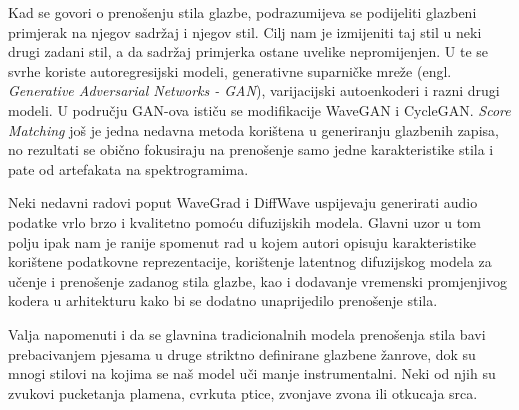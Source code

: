 Kad se govori o prenošenju stila glazbe, podrazumijeva se podijeliti glazbeni primjerak na njegov sadržaj i njegov stil. Cilj nam je izmijeniti taj stil u neki drugi zadani stil, a da sadržaj primjerka ostane uvelike nepromijenjen. U te se svrhe koriste autoregresijski modeli, generativne suparničke mreže (engl. \textit{Generative Adversarial Networks - GAN})\cite{goodfellow2020generative}, varijacijski autoenkoderi\cite{kingma2019introduction} i razni drugi modeli. U području GAN-ova ističu se modifikacije WaveGAN\cite{donahue2019adversarialaudiosynthesis} i CycleGAN\cite{brunner2018symbolicmusicgenretransfer}. \textit{Score Matching} još je jedna nedavna metoda korištena u generiranju glazbenih zapisa\cite{song2021scorebasedgenerativemodelingstochastic}, no rezultati se obično fokusiraju na prenošenje samo jedne karakteristike stila i pate od artefakata na spektrogramima.

Neki nedavni radovi poput WaveGrad\cite{chen2020wavegradestimatinggradientswaveform} i DiffWave\cite{kong2021diffwaveversatilediffusionmodel} uspijevaju generirati audio podatke vrlo brzo i kvalitetno pomoću difuzijskih modela. Glavni uzor u tom polju ipak nam je ranije spomenut rad\cite{huang2024musicstyletransferdiffusion} u kojem autori opisuju karakteristike korištene podatkovne reprezentacije, korištenje latentnog difuzijskog modela za učenje i prenošenje zadanog stila glazbe, kao i dodavanje vremenski promjenjivog kodera u arhitekturu kako bi se dodatno unaprijedilo prenošenje stila.

Valja napomenuti i da se glavnina tradicionalnih modela prenošenja stila bavi prebacivanjem pjesama u druge striktno definirane glazbene žanrove, dok su mnogi stilovi na kojima se naš model uči manje instrumentalni. Neki od njih su zvukovi pucketanja plamena, cvrkuta ptice, zvonjave zvona ili otkucaja srca.
